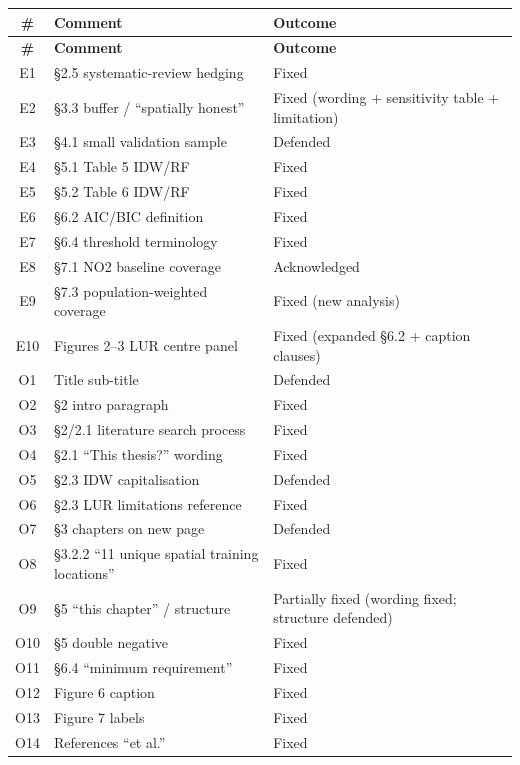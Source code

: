 \documentclass[11pt,a4paper]{article}
\begin{document}
\begin{longtable}{@{}c p{} p{}@{}}
\toprule
\textbf{\#} & \textbf{Comment} & \textbf{Outcome} \\
\midrule
\endfirsthead
\toprule
\textbf{\#} & \textbf{Comment} & \textbf{Outcome} \\
\midrule
\endhead
\endfoot
\bottomrule
\endlastfoot
E1  & \S2.5 systematic-review hedging & Fixed \\
E2  & \S3.3 buffer / ``spatially honest'' & Fixed (wording + sensitivity table + limitation) \\
E3  & \S4.1 small validation sample & Defended \\
E4  & \S5.1 Table 5 IDW/RF & Fixed \\
E5  & \S5.2 Table 6 IDW/RF & Fixed \\
E6  & \S6.2 AIC/BIC definition & Fixed \\
E7  & \S6.4 threshold terminology & Fixed \\
E8  & \S7.1 NO2 baseline coverage & Acknowledged \\
E9  & \S7.3 population-weighted coverage & Fixed (new analysis) \\
E10 & Figures 2--3 LUR centre panel & Fixed (expanded \S6.2 + caption clauses) \\
O1  & Title sub-title & Defended \\
O2  & \S2 intro paragraph & Fixed \\
O3  & \S2/2.1 literature search process & Fixed \\
O4  & \S2.1 ``This thesis?'' wording & Fixed \\
O5  & \S2.3 IDW capitalisation & Defended \\
O6  & \S2.3 LUR limitations reference & Fixed \\
O7  & \S3 chapters on new page & Defended \\
O8  & \S3.2.2 ``11 unique spatial training locations'' & Fixed \\
O9  & \S5 ``this chapter'' / structure & Partially fixed (wording fixed; structure defended) \\
O10 & \S5 double negative & Fixed \\
O11 & \S6.4 ``minimum requirement'' & Fixed \\
O12 & Figure 6 caption & Fixed \\
O13 & Figure 7 labels & Fixed \\
O14 & References ``et al.'' & Fixed \\
\end{longtable}
\end{document}
